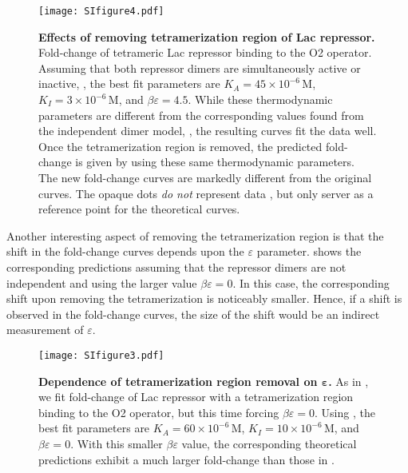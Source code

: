 \begin{figure}[h]
	\centering \texttt{[image: SIfigure4.pdf]}
	\caption{{\bf Effects of removing tetramerization region of Lac repressor.}
		 Fold-change of tetrameric Lac repressor binding to the O2
		operator. Assuming that both repressor dimers are simultaneously active or
		inactive, \eref[AppendixEq4], the best fit parameters are $K_A = 45 \times
		10^{-6}\,\text{M}$, $K_I = 3 \times 10^{-6}\,\text{M}$, and $\beta \varepsilon
		= 4.5$. While these thermodynamic parameters are different from the
		corresponding values found from the independent dimer model,
		\eref[AppendixEq2], the resulting curves fit the data well. 
		Once the tetramerization region is removed, the predicted fold-change is given
		by \eref[AppendixEq2] using these same thermodynamic parameters. The new
		fold-change curves are markedly different from the original curves. The opaque
		dots \textit{do not} represent data , but only server as a
		reference point for the theoretical curves. } \label{figAllosteryModels1}
\end{figure}

Another interesting aspect of removing the tetramerization region is that the
shift in the fold-change curves depends upon the $\varepsilon$ parameter.
\fref[figAllosteryModels2] shows the corresponding predictions assuming that
the repressor dimers are not independent and using the larger value $\beta
\varepsilon = 0$. In this case, the corresponding shift upon removing the
tetramerization is noticeably smaller. Hence, if a shift is observed in the
fold-change curves, the size of the shift would be an indirect measurement of
$\varepsilon$.

\begin{figure}[h]
	\centering \texttt{[image: SIfigure3.pdf]}
	\caption{{\bf Dependence of tetramerization region removal on $\boldsymbol{\varepsilon}$.}
		 As in \fref[figAllosteryModels1], we fit fold-change of Lac repressor with a tetramerization region binding to the O2 operator, but this time forcing $\beta \varepsilon = 0$. Using \eref[AppendixEq4], the best fit parameters are $K_A = 60 \times 10^{-6}\,\text{M}$, $K_I = 10 \times 10^{-6}\,\text{M}$, and $\beta \varepsilon = 0$.  With this smaller $\beta \varepsilon$ value, the corresponding theoretical predictions exhibit a much larger fold-change than those in \fref[figAllosteryModels1].
	}
	\label{figAllosteryModels2}
\end{figure}

